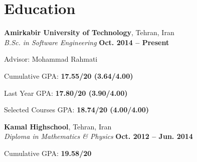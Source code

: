 \section{\sc Education}

{\bf Amirkabir University of Technology}, Tehran, Iran \\ 
\vspace{0.1cm}
\textit{B.Sc. in Software Engineering} \hfill{\textbf{Oct. 2014 -- Present}} \\
\vspace{-0.4cm}
\begin{list2}
	\item Advisor: Mohammad Rahmati
	\item Cumulative GPA: \textbf{17.55/20 (3.64/4.00)}
	\item Last Year GPA: \textbf{17.80/20 (3.90/4.00)}
	\item Selected Courses GPA: \textbf{18.74/20 (4.00/4.00)}
\end{list2}

{\bf Kamal Highschool}, Tehran, Iran\\ 
\vspace{0.1cm}
\textit{Diploma in Mathematics \& Physics} \hfill{\textbf{Oct. 2012 -- Jun. 2014}} \\
\vspace{-0.4cm}
\begin{list2}
	\item Cumulative GPA: \textbf{19.58/20}
\end{list2}

\endinput